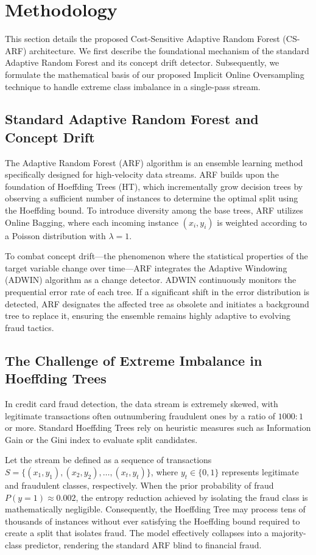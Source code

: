 \section{Methodology}
\label{sec:methodology}

This section details the proposed Cost-Sensitive Adaptive Random Forest (CS-ARF) architecture. We first describe the foundational mechanism of the standard Adaptive Random Forest and its concept drift detector. Subsequently, we formulate the mathematical basis of our proposed Implicit Online Oversampling technique to handle extreme class imbalance in a single-pass stream.

\subsection{Standard Adaptive Random Forest and Concept Drift}
The Adaptive Random Forest (ARF) algorithm is an ensemble learning method specifically designed for high-velocity data streams. ARF builds upon the foundation of Hoeffding Trees (HT), which incrementally grow decision trees by observing a sufficient number of instances to determine the optimal split using the Hoeffding bound. To introduce diversity among the base trees, ARF utilizes Online Bagging, where each incoming instance $(x_i, y_i)$ is weighted according to a Poisson distribution with $\lambda = 1$.

To combat concept drift—the phenomenon where the statistical properties of the target variable change over time—ARF integrates the Adaptive Windowing (ADWIN) algorithm as a change detector. ADWIN continuously monitors the prequential error rate of each tree. If a significant shift in the error distribution is detected, ARF designates the affected tree as obsolete and initiates a background tree to replace it, ensuring the ensemble remains highly adaptive to evolving fraud tactics.

\subsection{The Challenge of Extreme Imbalance in Hoeffding Trees}
In credit card fraud detection, the data stream is extremely skewed, with legitimate transactions often outnumbering fraudulent ones by a ratio of $1000:1$ or more. Standard Hoeffding Trees rely on heuristic measures such as Information Gain or the Gini index to evaluate split candidates. 

Let the stream be defined as a sequence of transactions $S = \{ (x_1, y_1), (x_2, y_2), \dots, (x_t, y_t) \}$, where $y_t \in \{0, 1\}$ represents legitimate and fraudulent classes, respectively. When the prior probability of fraud $P(y=1) \approx 0.002$, the entropy reduction achieved by isolating the fraud class is mathematically negligible. Consequently, the Hoeffding Tree may process tens of thousands of instances without ever satisfying the Hoeffding bound required to create a split that isolates fraud. The model effectively collapses into a majority-class predictor, rendering the standard ARF blind to financial fraud.

